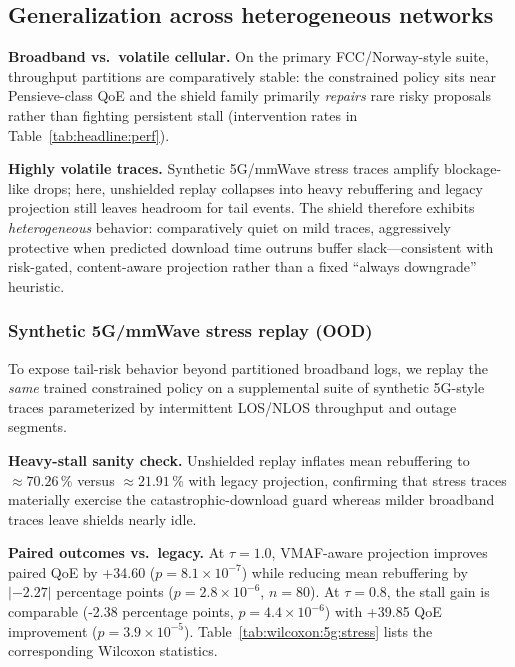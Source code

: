 \documentclass[preprint,12pt,times]{elsarticle}
\providecommand{\VNepisodes}{80}
\providecommand{\VFiveGRbShieldOff}{70.26}
\providecommand{\VFiveGRbShieldLegacy}{21.91}
\providecommand{\VFiveGPairedDQoE}{+39.85}
\providecommand{\VFiveGPairedPQoE}{3.9\!\times\!10^{-5}}
\providecommand{\VFiveGPairedDRb}{-2.38}
\providecommand{\VFiveGPairedPRb}{4.4\!\times\!10^{-6}}
\providecommand{\VFiveGPairedDQoEten}{+34.60}
\providecommand{\VFiveGPairedPQoEten}{8.1\!\times\!10^{-7}}
\providecommand{\VFiveGPairedDRbten}{-2.27}
\providecommand{\VFiveGPairedPRbten}{2.8\!\times\!10^{-6}}
\begin{document}
\subsection{Generalization across heterogeneous networks}\label{sec:eval:generalization}

\textbf{Broadband vs.\ volatile cellular.} On the primary FCC/Norway-style suite, throughput partitions are comparatively stable: the constrained policy sits near Pensieve-class QoE and the shield family primarily \emph{repairs} rare risky proposals rather than fighting persistent stall (intervention rates in Table~\ref{tab:headline:perf}).

\textbf{Highly volatile traces.} Synthetic 5G/mmWave stress traces amplify blockage-like drops; here, unshielded replay collapses into heavy rebuffering and legacy projection still leaves headroom for tail events.
The shield therefore exhibits \emph{heterogeneous} behavior: comparatively quiet on mild traces, aggressively protective when predicted download time outruns buffer slack---consistent with risk-gated, content-aware projection rather than a fixed ``always downgrade'' heuristic.

\subsubsection{Synthetic 5G/mmWave stress replay (OOD)}\label{sec:eval:ood}
To expose tail-risk behavior beyond partitioned broadband logs, we replay the \emph{same} trained constrained policy on a supplemental suite of synthetic 5G-style traces parameterized by intermittent LOS/NLOS throughput and outage segments.

\textbf{Heavy-stall sanity check.} Unshielded replay inflates mean rebuffering to \(\approx\VFiveGRbShieldOff\,\%\) versus \(\approx\VFiveGRbShieldLegacy\,\%\) with legacy projection, confirming that stress traces materially exercise the catastrophic-download guard whereas milder broadband traces leave shields nearly idle.

\textbf{Paired outcomes vs.\ legacy.}
At \(\tau{=}1.0\), VMAF-aware projection improves paired QoE by \VFiveGPairedDQoEten{} ($p{=}\VFiveGPairedPQoEten$) while reducing mean rebuffering by \(|{\VFiveGPairedDRbten}|\) percentage points ($p{=}\VFiveGPairedPRbten$, $n{=}\VNepisodes$).
At \(\tau{=}0.8\), the stall gain is comparable (\VFiveGPairedDRb{} percentage points, \(p{=}\VFiveGPairedPRb\)) with \VFiveGPairedDQoE{} QoE improvement ($p{=}\VFiveGPairedPQoE$).
Table~\ref{tab:wilcoxon:5g:stress} lists the corresponding Wilcoxon statistics.
\end{document}
